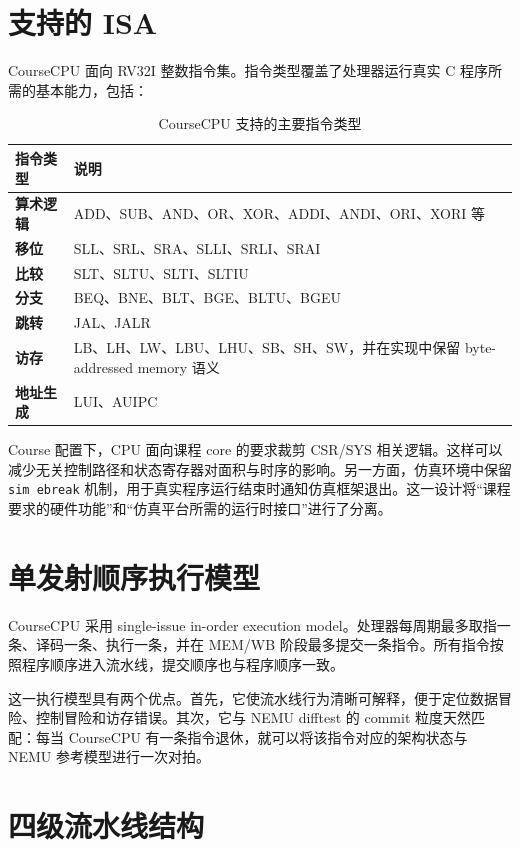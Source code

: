 \documentclass[UTF8,a4paper,12pt]{ctexrep}
\begin{document}
\section{支持的 ISA}

CourseCPU 面向 RV32I 整数指令集。指令类型覆盖了处理器运行真实 C 程序所需的基本能力，包括：

\begin{table}[htbp]
  \centering
  \caption{CourseCPU 支持的主要指令类型}
  \begin{tabularx}{\textwidth}{>{\bfseries}lX}
    \toprule
    指令类型 & 说明 \\
    \midrule
    算术逻辑 & ADD、SUB、AND、OR、XOR、ADDI、ANDI、ORI、XORI 等 \\
    移位 & SLL、SRL、SRA、SLLI、SRLI、SRAI \\
    比较 & SLT、SLTU、SLTI、SLTIU \\
    分支 & BEQ、BNE、BLT、BGE、BLTU、BGEU \\
    跳转 & JAL、JALR \\
    访存 & LB、LH、LW、LBU、LHU、SB、SH、SW，并在实现中保留 byte-addressed memory 语义 \\
    地址生成 & LUI、AUIPC \\
    \bottomrule
  \end{tabularx}
\end{table}

Course 配置下，CPU 面向课程 core 的要求裁剪 CSR/SYS 相关逻辑。这样可以减少无关控制路径和状态寄存器对面积与时序的影响。另一方面，仿真环境中保留 \texttt{sim ebreak} 机制，用于真实程序运行结束时通知仿真框架退出。这一设计将“课程要求的硬件功能”和“仿真平台所需的运行时接口”进行了分离。

\section{单发射顺序执行模型}

CourseCPU 采用 single-issue in-order execution model。处理器每周期最多取指一条、译码一条、执行一条，并在 MEM/WB 阶段最多提交一条指令。所有指令按照程序顺序进入流水线，提交顺序也与程序顺序一致。

这一执行模型具有两个优点。首先，它使流水线行为清晰可解释，便于定位数据冒险、控制冒险和访存错误。其次，它与 NEMU difftest 的 commit 粒度天然匹配：每当 CourseCPU 有一条指令退休，就可以将该指令对应的架构状态与 NEMU 参考模型进行一次对拍。

\section{四级流水线结构}
\end{document}
